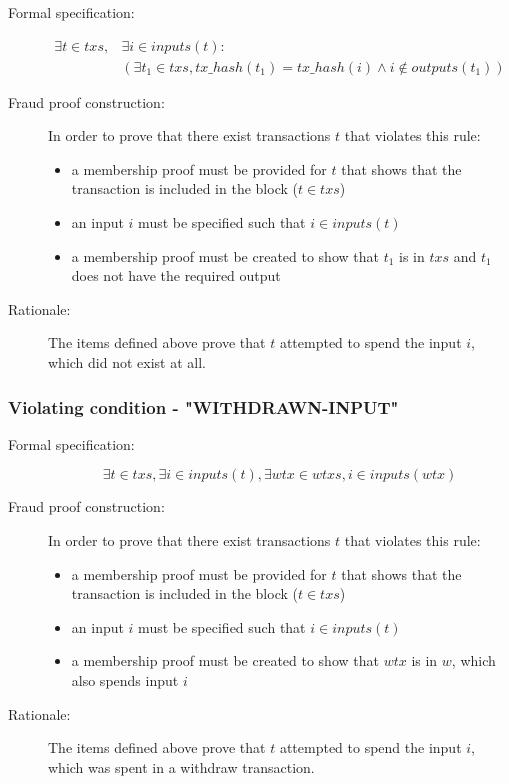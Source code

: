 \documentclass[../main.tex]{subfiles}
\begin{document}
\begin{description}

\item[Formal specification:]
\begin{equation*}
\begin{split}
    \exists t \in txs, &\exists i \in inputs(t): \\
    &( \exists t_1 \in txs, tx\_hash(t_1) = tx\_hash(i) \land i \notin outputs(t_1) )
\end{split}
\end{equation*}

\item[Fraud proof construction:] In order to prove that there exist transactions $t$ that violates this rule:
\begin{itemize}
    \item a membership proof must be provided for $t$ that shows that the transaction is included in the block ($t \in txs$)
    \item an input $i$ must be specified such that $i \in inputs(t)$
    \item a membership proof must be created to show that $t_1$ is in $txs$ and $t_1$ does not have the required output
\end{itemize}

\item[Rationale:] The items defined above prove that $t$ attempted to spend the input $i$, which did not exist at all.

\end{description}

\subsubsection{Violating condition - "WITHDRAWN-INPUT"}
\label{sec:WITHDRAWN-INPUT}

\begin{description}

\item[Formal specification:]
\begin{equation*}
    \exists t \in txs, \exists i \in inputs(t), \exists wtx \in wtxs, i \in inputs(wtx)
\end{equation*}

\item[Fraud proof construction:] In order to prove that there exist transactions $t$ that violates this rule:
\begin{itemize}
    \item a membership proof must be provided for $t$ that shows that the transaction is included in the block ($t \in txs$)
    \item an input $i$ must be specified such that $i \in inputs(t)$
    \item a membership proof must be created to show that $wtx$ is in $w$, which also spends input $i$
\end{itemize}

\item[Rationale:] The items defined above prove that $t$ attempted to spend the input $i$, which was spent in a withdraw transaction.

\end{description}
\end{document}
